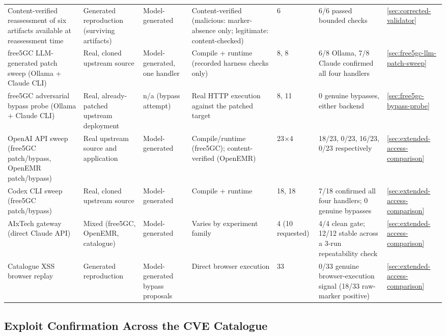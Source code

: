 \documentclass[12pt,a4paper]{report}
\begin{document}
\begin{landscape}
\begin{longtable}{@{}p{3.6cm}p{2.3cm}p{2cm}p{2.7cm}p{1.1cm}p{4.3cm}p{1.1cm}@{}}
Content-verified reassessment of six artifacts available at reassessment time & Generated reproduction (surviving artifacts) & Model-generated & Content-verified (malicious: marker-absence only; legitimate: content-checked) & 6 & 6/6 passed bounded checks & \ref{sec:corrected-validator} \\
free5GC LLM-generated patch sweep (Ollama + Claude CLI) & Real, cloned upstream source & Model-generated, one handler & Compile + runtime (recorded harness checks only) & 8, 8 & 6/8 Ollama, 7/8 Claude confirmed all four handlers & \ref{sec:free5gc-llm-patch-sweep} \\
free5GC adversarial bypass probe (Ollama + Claude CLI) & Real, already-patched upstream deployment & n/a (bypass attempt) & Real HTTP execution against the patched target & 8, 11 & 0 genuine bypasses, either backend & \ref{sec:free5gc-bypass-probe} \\
OpenAI API sweep (free5GC patch/bypass, OpenEMR patch/bypass) & Real upstream source and application & Model-generated & Compile/runtime (free5GC); content-verified (OpenEMR) & 23$\times$4 & 18/23, 0/23, 16/23, 0/23 respectively & \ref{sec:extended-access-comparison} \\
Codex CLI sweep (free5GC patch/bypass) & Real, cloned upstream source & Model-generated & Compile + runtime & 18, 18 & 7/18 confirmed all four handlers; 0 genuine bypasses & \ref{sec:extended-access-comparison} \\
AIxTech gateway (direct Claude API) & Mixed (free5GC, OpenEMR, catalogue) & Model-generated & Varies by experiment family & 4 (10 requested) & 4/4 clean gate; 12/12 stable across a 3-run repeatability check & \ref{sec:extended-access-comparison} \\
Catalogue XSS browser replay & Generated reproduction & Model-generated bypass proposals & Direct browser execution & 33 & 0/33 genuine browser-execution signal (18/33 raw-marker positive) & \ref{sec:extended-access-comparison} \\
\end{longtable}
\end{landscape}

\subsection{Exploit Confirmation Across the CVE Catalogue}
\label{sec:exploit-confirmation-catalogue}
\end{document}

